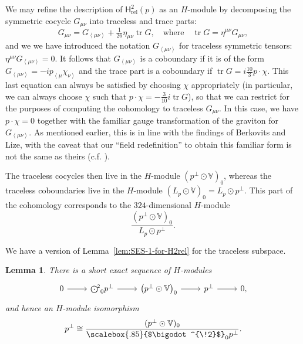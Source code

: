 \documentclass[11pt,reqno,a4paper,final]{amsart}
\newcommand\sym[1]{\scalebox{.85}{$\bigodot^{\!#1}$}}
\theoremstyle{plain}
\newtheorem{lemma}{Lemma}
\theoremstyle{definition}
\newcommand{\Hrel}{\mathsf{H}_{\mathrm{rel}}}
\newcommand{\tr}{\operatorname{tr}}
\newcommand{\VV}{\mathbb{V}}
\newcommand{\1}{\mathbb{1}}
\numberwithin{equation}{section}
\begin{document}
We may refine the description of $\Hrel^2(p)$ as an $H$-module by
decomposing the symmetric cocycle $G_{\mu\nu}$ into traceless and
trace parts:
\begin{equation}
  G_{\mu\nu} = G_{\left<\mu\nu\right>} + \tfrac1{26} \eta_{\mu\nu} \tr
  G, \quad\text{where}\quad \tr G = \eta^{\mu\nu} G_{\mu\nu},
\end{equation}
and we we have introduced the notation $G_{\left<\mu\nu\right>}$ for
traceless symmetric tensors:
$\eta^{\mu\nu}G_{\left<\mu\nu\right>} = 0$.  It follows that
$G_{\left<\mu\nu\right>}$ is a coboundary if it is of the form
$G_{\left<\mu\nu\right>} = -i p_{\left<\mu\right.}
\chi_{\left.\nu\right>}$ and the trace part is a coboundary if
$\tr G = i \tfrac{10}3 p \cdot \chi$.  This last equation can always
be satisfied by choosing $\chi$ appropriately (in particular, we can always choose $\chi$ such that $p \cdot \chi = -\tfrac{3}{10}i \tr G$), so that we can restrict
for the purposes of computing the cohomology to traceless
$G_{\mu\nu}$. In this case, we have $p \cdot \chi = 0$ together with the familiar gauge transformation of the graviton for $G_{\left<\mu\nu\right>}$. As mentioned earlier, this is in line with the findings of Berkovits and Lize, with the caveat that our ``field redefinition'' to obtain this familiar form is not the same as theirs (c.f. \cite[Section 2.3]{Berkovits:2018jvm}).

The traceless cocycles then live in the $H$-module
$(p^\perp \odot \VV)_0$, whereas the traceless coboundaries live in the
$H$-module $(L_p \odot \VV)_0 = L_p \odot p^\perp$.  This part of the
cohomology corresponds to the $324$-dimensional $H$-module
\begin{equation}
  \label{eq:h2rel-symmetric-traceless}
  \dfrac{\left( p^\perp \odot \VV \right)_0}{L_p \odot p^\perp}.
\end{equation}

We have a version of Lemma~\ref{lem:SES-1-for-H2rel} for the traceless
subspace.

\begin{lemma}
  \label{lem:SES-1-for-H2rel-traceless}
  There is a short exact sequence of $H$-modules
  \begin{equation}
    \begin{tikzcd}
      0 \arrow[r] & \sym{2}_0p^\perp \arrow[r] & \left( p^\perp \odot \VV \right)_0 \arrow[r] & p^\perp \arrow[r] & 0,
    \end{tikzcd}
  \end{equation}
  and hence an $H$-module isomorphism
  \begin{equation}
    p^\perp \cong \dfrac{(p^\perp\odot \VV)_0}{\sym{2}_0p^\perp}.
  \end{equation}
\end{lemma}
\end{document}
